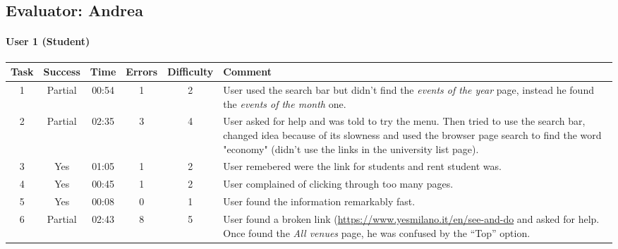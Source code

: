 \begin{small}
\pagebreak

\subsection{Evaluator: Andrea}

\paragraph{User 1 (Student)}
\begin{tabularx}{\linewidth}{c c c c c X}
    \toprule
    \textbf{Task} & \textbf{Success} & \textbf{Time}
     & \textbf{Errors} & \textbf{Difficulty} & \textbf{Comment} \\
    \midrule
    1 & Partial & 00:54 & 1 & 2 & User used the search bar but didn't find the \emph{events of the year} page, instead he found the \emph{events of the month} one. \\ \midrule
    2 & Partial & 02:35 & 3 & 4 & User asked for help and was told to try the menu. Then tried to use the search bar, changed idea because of its slowness and used the browser page search to find the word "economy" (didn't use the links in the university list page). \\ \midrule
    3 & Yes & 01:05 & 1 & 2 & User remebered were the link for students and rent student was. \\ \midrule
    4 & Yes & 00:45 & 1 & 2 & User complained of clicking through too many pages. \\ \midrule
    5 & Yes & 00:08 & 0 & 1 & User found the information remarkably fast. \\ \midrule
    6 & Partial & 02:43 & 8 & 5 & User found a broken link (\hyperref["Info on museums - art venues open"]{https://www.yesmilano.it/en/see-and-do} and asked for help. Once found the \emph{All venues} page, he was confused by the ``Top'' option. \\ \bottomrule
\end{tabularx}


\end{small}
